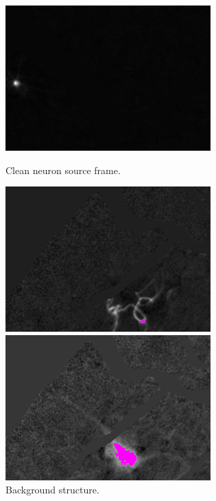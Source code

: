 \documentclass[10pt]{article}
\begin{document}
\begin{figure}[h]
    \centering
    \begin{minipage}{.33\textwidth}
      \centering
      \includegraphics[width=.9\linewidth]{frame_2.png}
      \caption{\footnotesize Clean neuron source frame.}
      \label{fig:frame1}
    \end{minipage}%
    \begin{minipage}{.33\textwidth}
      \centering
      \includegraphics[width=.9\linewidth]{frame_3.png}
      \caption{\footnotesize Background structure. }
      \label{fig:frame2}
    \end{minipage}
    \begin{minipage}{.33\textwidth}
      \centering
      \includegraphics[width=.9\linewidth]{frame_4.png}

\end{minipage}
\end{figure}
\end{document}
